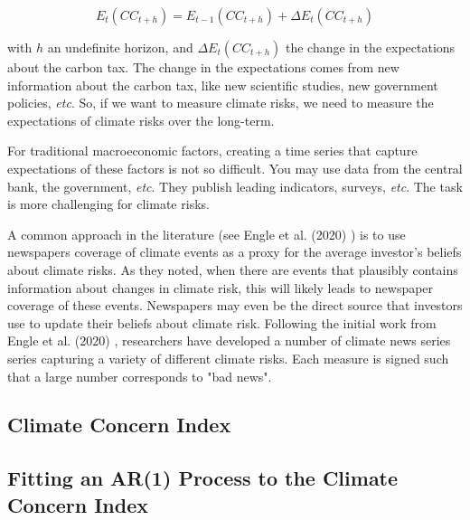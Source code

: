 \begin{equation}
    E_t(CC_{t+h}) = E_{t-1}(CC_{t+h}) + \Delta E_t(CC_{t+h})
\end{equation}

with $h$ an undefinite horizon, and $\Delta E_t(CC_{t+h})$
the change in the expectations about the carbon tax.
The change in the expectations comes from 
new information about the carbon tax, like
new scientific studies, new government policies,
\textit{etc}. So, if we want to measure climate risks,
we need to measure the expectations of climate risks
over the long-term.

For traditional macroeconomic factors, 
creating a time series that capture expectations 
of these factors is not so difficult. You may 
use data from the central bank, the government,
\textit{etc}. They publish leading indicators,
surveys, \textit{etc}. The task is more 
challenging for climate risks.

A common approach in the literature (see Engle et al. (2020) \cite{engle2020hedging})
is to use newspapers coverage of climate events as a proxy 
for the average investor's beliefs about climate risks.
As they noted, when there are events that plausibly
contains information about changes in climate risk,
this will likely leads to newspaper coverage of these events.
Newspapers may even be the direct source that investors
use to update their beliefs about climate risk.
Following the initial work from Engle et al. (2020) \cite{engle2020hedging},
researchers have developed a number of climate 
news series series capturing a variety of different climate risks.
Each measure is signed such that a large number 
corresponds to "bad news".



\subsection{Climate Concern Index}

\subsection{Fitting an AR(1) Process
to the Climate Concern Index}


